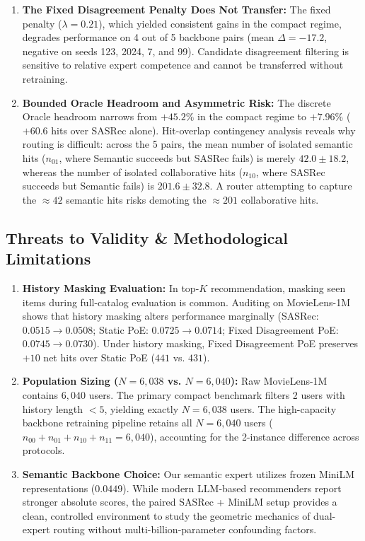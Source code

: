 \begin{enumerate}[leftmargin=*]
    \item \textbf{The Fixed Disagreement Penalty Does Not Transfer:} The fixed penalty ($\lambda=0.21$), which yielded consistent gains in the compact regime, degrades performance on 4 out of 5 backbone pairs (mean $\Delta = -17.2$, negative on seeds 123, 2024, 7, and 99). Candidate disagreement filtering is sensitive to relative expert competence and cannot be transferred without retraining.
    \item \textbf{Bounded Oracle Headroom and Asymmetric Risk:} The discrete Oracle headroom narrows from $+45.2\%$ in the compact regime to $+7.96\%$ ($+60.6$ hits over SASRec alone). Hit-overlap contingency analysis reveals why routing is difficult: across the 5 pairs, the mean number of isolated semantic hits ($n_{01}$, where Semantic succeeds but SASRec fails) is merely $42.0 \pm 18.2$, whereas the number of isolated collaborative hits ($n_{10}$, where SASRec succeeds but Semantic fails) is $201.6 \pm 32.8$. A router attempting to capture the $\approx 42$ semantic hits risks demoting the $\approx 201$ collaborative hits.
\end{enumerate}

\subsection{Threats to Validity \& Methodological Limitations}
\begin{enumerate}[leftmargin=*]
    \item \textbf{History Masking Evaluation:} In top-$K$ recommendation, masking seen items during full-catalog evaluation is common. Auditing on MovieLens-1M shows that history masking alters performance marginally (SASRec: $0.0515 \to 0.0508$; Static PoE: $0.0725 \to 0.0714$; Fixed Disagreement PoE: $0.0745 \to 0.0730$). Under history masking, Fixed Disagreement PoE preserves $+10$ net hits over Static PoE ($441$ vs. $431$).
    \item \textbf{Population Sizing ($N=6{,}038$ vs. $N=6{,}040$):} Raw MovieLens-1M contains $6{,}040$ users. The primary compact benchmark filters 2 users with history length $< 5$, yielding exactly $N = 6{,}038$ users. The high-capacity backbone retraining pipeline retains all $N = 6{,}040$ users ($n_{00} + n_{01} + n_{10} + n_{11} = 6{,}040$), accounting for the 2-instance difference across protocols.
    \item \textbf{Semantic Backbone Choice:} Our semantic expert utilizes frozen MiniLM representations ($0.0449$). While modern LLM-based recommenders report stronger absolute scores, the paired SASRec + MiniLM setup provides a clean, controlled environment to study the geometric mechanics of dual-expert routing without multi-billion-parameter confounding factors.
\end{enumerate}

